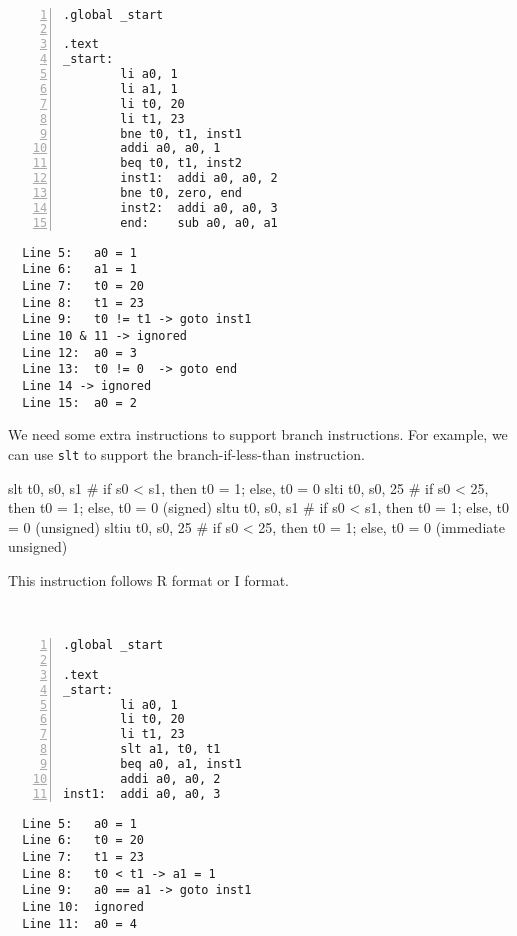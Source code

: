 \begin{eg}~

\begin{minipage}{0.5\textwidth}
\begin{Verbatim}[numbers=left,xleftmargin=5mm]
.global _start

.text
_start:
        li a0, 1
        li a1, 1
        li t0, 20
        li t1, 23
        bne t0, t1, inst1
        addi a0, a0, 1
        beq t0, t1, inst2
        inst1:  addi a0, a0, 2
        bne t0, zero, end
        inst2:  addi a0, a0, 3
        end:    sub a0, a0, a1
\end{Verbatim}
\end{minipage}
\begin{minipage}{0.5\textwidth}
\color{red}
\begin{verbatim}
  Line 5:   a0 = 1
  Line 6:   a1 = 1
  Line 7:   t0 = 20
  Line 8:   t1 = 23
  Line 9:   t0 != t1 -> goto inst1
  Line 10 & 11 -> ignored
  Line 12:  a0 = 3
  Line 13:  t0 != 0  -> goto end 
  Line 14 -> ignored
  Line 15:  a0 = 2
\end{verbatim}
\end{minipage}
\end{eg}

We need some extra instructions to support branch instructions. For example, we can use \verb|slt| to support the branch-if-less-than instruction.
\begin{codeBlock}
  slt t0, s0, s1      # if s0 < s1, then t0 = 1; else, t0 = 0
  slti t0, s0, 25     # if s0 < 25, then t0 = 1; else, t0 = 0 (signed)
  sltu t0, s0, s1     # if s0 < s1, then t0 = 1; else, t0 = 0 (unsigned)
  sltiu t0, s0, 25    # if s0 < 25, then t0 = 1; else, t0 = 0 (immediate unsigned)
\end{codeBlock}

This instruction follows R format or I format. 

\begin{eg}~

\begin{minipage}{0.5\textwidth}
\begin{Verbatim}[numbers=left,xleftmargin=5mm]
.global _start

.text
_start:
        li a0, 1
        li t0, 20
        li t1, 23
        slt a1, t0, t1
        beq a0, a1, inst1
        addi a0, a0, 2
inst1:  addi a0, a0, 3
\end{Verbatim}
\end{minipage}
\begin{minipage}{0.5\textwidth}
\color{red}
\begin{verbatim}
  Line 5:   a0 = 1
  Line 6:   t0 = 20
  Line 7:   t1 = 23
  Line 8:   t0 < t1 -> a1 = 1
  Line 9:   a0 == a1 -> goto inst1
  Line 10:  ignored
  Line 11:  a0 = 4
\end{verbatim}
\end{minipage}
\end{eg}

